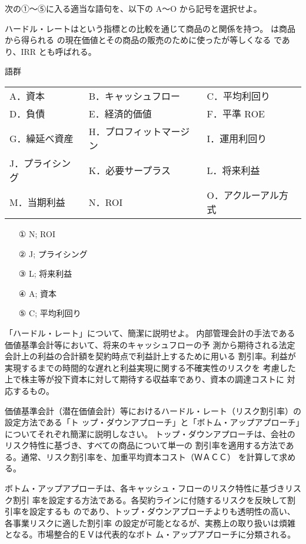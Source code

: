 \documentclass[report,gutter=10mm,fore-edge=10mm,uplatex,dvipdfmx]{jlreq}
\begin{document}
次の①～⑤に入る適当な語句を、以下の A～O から記号を選択せよ。

ハードル・レートはという指標との比較を通じて商品のと関係を持つ。
は商品から得られる
の現在価値とその商品の販売のために使ったが等しくなる
であり、IRR とも呼ばれる。

語群
\begin{tabular}{lll}
A．資本 & B．キャッシュフロー& C．平均利回り\\
D．負債 &E．経済的価値 & F．平準 ROE\\
G．繰延べ資産 & H．プロフィットマージン&  I．運用利回り\\
J．プライシング & K．必要サープラス&L．将来利益 \\
M．当期利益 &N．ROI &O．アクルーアル方式 \\
\end{tabular}

\answer{}
\begin{itemize}
\item[①] N; ROI
\item[②] J; プライシング
\item[③] L; 将来利益 
\item[④] A; 資本
\item[⑤] C; 平均利回り
\end{itemize}

「ハードル・レート」について、簡潔に説明せよ。
\answer{}
内部管理会計の手法である価値基準会計等において、将来のキャッシュフローの予
測から期待される法定会計上の利益の合計額を契約時点で利益計上するために用いる
割引率。利益が実現するまでの時間的な遅れと利益実現に関する不確実性のリスクを
考慮した上で株主等が投下資本に対して期待する収益率であり、資本の調達コストに
対応するもの。

価値基準会計（潜在価値会計）等におけるハードル・レート（リスク割引率）の設定方法である「ト
ップ・ダウンアプローチ」と「ボトム・アップアプローチ」についてそれぞれ簡潔に説明しなさい。
\answer{}
トップ・ダウンアプローチは、会社のリスク特性に基づき、すべての商品について単一の
割引率を適用する方法である。通常、リスク割引率を、加重平均資本コスト（ＷＡＣＣ）
を計算して求める。

ボトム・アップアプローチは、各キャッシュ・フローのリスク特性に基づきリスク割引
率を設定する方法である。各契約ラインに付随するリスクを反映して割引率を設定するも
のであり、トップ・ダウンアプローチよりも透明性の高い、各事業リスクに適した割引率
の設定が可能となるが、実務上の取り扱いは煩雑となる。市場整合的ＥＶは代表的なボト
ム・アップアプローチに分類される。
\end{document}

